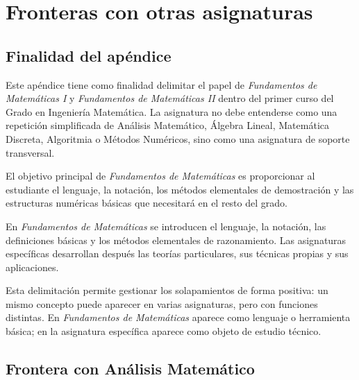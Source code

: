 % 
%

\chapter{Fronteras con otras asignaturas}
\label{ap:fronteras-asignaturas}

\section{Finalidad del apéndice}

Este apéndice tiene como finalidad delimitar el papel de \emph{Fundamentos de Matemáticas I} y \emph{Fundamentos de Matemáticas II} dentro del primer curso del Grado en Ingeniería Matemática. La asignatura no debe entenderse como una repetición simplificada de Análisis Matemático, Álgebra Lineal, Matemática Discreta, Algoritmia o Métodos Numéricos, sino como una asignatura de soporte transversal.

El objetivo principal de \emph{Fundamentos de Matemáticas} es proporcionar al estudiante el lenguaje, la notación, los métodos elementales de demostración y las estructuras numéricas básicas que necesitará en el resto del grado.

\begin{convencion}
En \emph{Fundamentos de Matemáticas} se introducen el lenguaje, la notación, las definiciones básicas y los métodos elementales de razonamiento. Las asignaturas específicas desarrollan después las teorías particulares, sus técnicas propias y sus aplicaciones.
\end{convencion}

Esta delimitación permite gestionar los solapamientos de forma positiva: un mismo concepto puede aparecer en varias asignaturas, pero con funciones distintas. En \emph{Fundamentos de Matemáticas} aparece como lenguaje o herramienta básica; en la asignatura específica aparece como objeto de estudio técnico.

\section{Frontera con Análisis Matemático}

